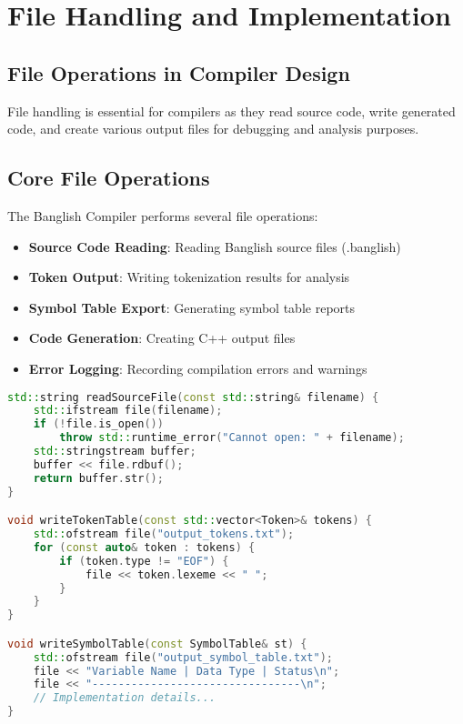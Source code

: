 \documentclass[12pt,a4paper]{article}
\begin{document}
\section{File Handling and Implementation}

\subsection{File Operations in Compiler Design}

File handling is essential for compilers as they read source code, write generated code, and create various output files for debugging and analysis purposes.

\subsection{Core File Operations}

The Banglish Compiler performs several file operations:

\begin{itemize}[leftmargin=*,itemsep=3pt]
    \item \textbf{Source Code Reading}: Reading Banglish source files (.banglish)
    \item \textbf{Token Output}: Writing tokenization results for analysis
    \item \textbf{Symbol Table Export}: Generating symbol table reports
    \item \textbf{Code Generation}: Creating C++ output files
    \item \textbf{Error Logging}: Recording compilation errors and warnings
\end{itemize}

\begin{lstlisting}[language=C++, caption=File Handling Implementation]
std::string readSourceFile(const std::string& filename) {
    std::ifstream file(filename);
    if (!file.is_open()) 
        throw std::runtime_error("Cannot open: " + filename);
    std::stringstream buffer;
    buffer << file.rdbuf();
    return buffer.str();
}

void writeTokenTable(const std::vector<Token>& tokens) {
    std::ofstream file("output_tokens.txt");
    for (const auto& token : tokens) {
        if (token.type != "EOF") {
            file << token.lexeme << " ";
        }
    }
}

void writeSymbolTable(const SymbolTable& st) {
    std::ofstream file("output_symbol_table.txt");
    file << "Variable Name | Data Type | Status\n";
    file << "--------------------------------\n";
    // Implementation details...
}
\end{lstlisting}
\end{document}
